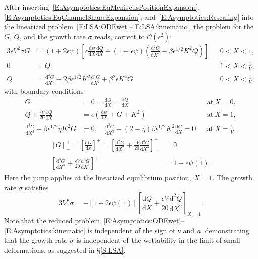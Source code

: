 \documentclass{jfm}
\newcommand{\dd}[2]{\frac{\mathrm{d} #1}{\mathrm{d} #2}}
\newcommand{\ddp}[2]{\frac{\partial #1}{\partial #2}}
\newcommand{\poisson}{\eta} %
\newcommand{\aspect}{a} %
\begin{document}
After inserting~\eqref{E:Asymptotics:EqMeniscusPositionExpansion}, \eqref{E:Asymptotics:EqChannelShapeExpansion}, and~\eqref{E:Asymptotics:Rescaling} into the linearized problem~\eqref{E:LSA:ODEwet}--\eqref{E:LSA:kinematic}, the problem for the $G$, $Q$, and the growth rate $\sigma$ reads, correct to $\mathcal{O}(\epsilon^2)$:
\begin{align}
3\epsilon V^2 \sigma G &= \left(1 + 2\epsilon \psi\right)\left[\epsilon\dd{\psi}{X} \dd{Q}{X} + \left(1 + \epsilon \psi\right)\left(\dd{^2 Q}{X^2} - \beta \epsilon^{1/2} K^2 Q\right)\right] & &0 < X < 1,\label{E:Asymptotics:ODEwet}\\
0 &= Q & &1 < X < \frac{1}{V},\label{E:Asymptotics:ODEdry}\\
Q &= \dd{^4 G}{X^4} - 2\beta \epsilon^{1/2} K^2 \dd{^2 G}{X^2} +\beta^2 \epsilon K^4 G & &0 < X<\frac{1}{V},\label{A:Asymptotics:state_BVP:pressure2shape}
\end{align}
with boundary conditions
\begin{align}
G &= 0 = \dd{G}{X} = \dd{Q}{X} & &\text{at}~X = 0,\label{E:Asymptotics:BC_at_0}\\
Q + \frac{\epsilon V}{20}\ddp{Q}{X} &= \epsilon\left(\dd{\psi}{X} + G + K^2\right)  & &\text{at}~X= 1,\label{E:Asymptotics:pressure_bc}\\
\dd{^2 G}{X^2} -\beta \epsilon^{1/2} \poisson K^2 G &= 0, \quad  \dd{^3 G}{X^3} - (2-\poisson)\beta \epsilon^{1/2} K^2 \dd{G}{X} = 0 & &\text{at}~X = \frac{1}{V},\label{E:Asymptotics:BC_at_1}
\end{align}
\begin{align}\label{E:Asymptotics:jump_conds}
\left[G\right]_-^+= \left[\dd{G}{x}\right]_-^+ = \left[\dd{^2G}{X^2} + \frac{\epsilon V}{20}\dd{^3 G}{X^3}\right]_-^+&= 0, \\
\left[\dd{^3 G}{X^3} + \frac{\epsilon V}{20}\dd{^4 G}{X^4}\right]_-^+ &= 1 - \epsilon \psi(1).
\end{align}
Here the jump applies at the linearized equilibrium position, $X = 1$. The growth rate $\sigma$ satisfies
\begin{equation}\label{E:Asymptotics:kinematic}
3V^2\sigma = -\left[1 + 2\epsilon \psi(1)\right]\left[\dd{Q}{X} + \frac{\epsilon V}{20}\dd{^2 Q}{X^2}\right]_{X = 1}.
\end{equation}
Note that the reduced problem~\eqref{E:Asymptotics:ODEwet}--\eqref{E:Asymptotics:kinematic} is independent of the sign of $\nu$ and $\aspect$, demonstrating that the growth rate $\sigma$ is independent of the wettability in the limit of small deformations, as suggested in \S\ref{S:LSA}.
\end{document}
